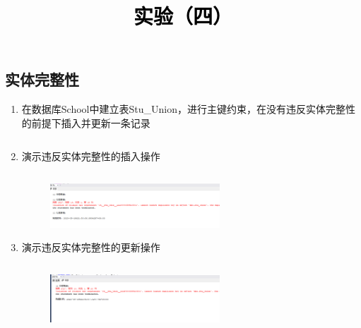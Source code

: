 \documentclass[a4paper,twoside]{article}
\newcommand{\PaperTitle}{实验（四）}  %
\begin{document}
\newpage

\title{
	\Large{\textcolor{black}{\PaperTitle}}
}
	
	
\maketitle
	
\tableofcontents
 
\newpage
\setcounter{page}{1}

\begin{spacing}{1.2}

\section{实体完整性}

\begin{enumerate}
  \item 在数据库School中建立表Stu\_Union，进行主键约束，在没有违反实体完整性的前提下插入并更新一条记录
  \inputminted[firstline=3,lastline=15]{sql}{../code/1.sql}
  \item 演示违反实体完整性的插入操作
  \inputminted[firstline=18,lastline=22]{sql}{../code/1.sql}

  \begin{figure}[H]
    \centering
    \includegraphics[width=0.6\textwidth]{1.png}
  \end{figure}

  \item 演示违反实体完整性的更新操作
  \inputminted[firstline=27,lastline=30]{sql}{../code/1.sql}

  \begin{figure}[H]
    \centering
    \includegraphics[width=0.6\textwidth]{2.png}
  \end{figure}


\end{enumerate}
\end{spacing}
\end{document}
